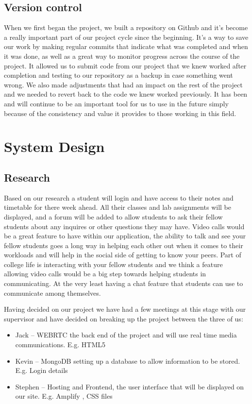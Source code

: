 \section{Version control }
When we first began the project, we built a repository on Github\cite{ref5} and it's become a really important part of our project cycle since the beginning. It's a way to save our work by making regular commits that indicate what was completed and when it was done, as well as a great way to monitor progress across the course of the project. It allowed us to submit code from our project that we knew worked after completion and testing to our repository as a backup in case something went wrong. We also made adjustments that had an impact on the rest of the project and we needed to revert back to the code we knew worked previously. It has been and will continue to be an important tool for us to use in the future simply because of the consistency and value it provides to those working in this field.


\chapter{System Design}
\section{Research}
Based on our research a student will login and have access to their notes and timetable for there week ahead. All their classes and lab assignments will be displayed, and a forum will be added to allow students to ask their fellow students about any inquires or other questions they may have. 
Video calls would be a great feature to have within our application, the ability to talk and see your fellow students goes a long way in helping each other out when it comes to their workloads and will help in the social side of getting to know your peers. Part of college life is interacting with your fellow students and we think a feature allowing video calls would be a big step towards helping students in communicating. At the very least having a chat feature that students can use to communicate among themselves. 

Having decided on our project we have had a few meetings at this stage with our supervisor and have decided on breaking up the project between the three of us: 


\begin{itemize}
  \item Jack – WEBRTC the back end of the project and will use real time media communications. E.g. HTML5 
  \item Kevin – MongoDB setting up a database to allow information to be stored. E.g. Login details
  \item Stephen – Hosting and Frontend, the user interface that will be displayed on our site. E.g. Amplify , CSS files 
\end{itemize}

